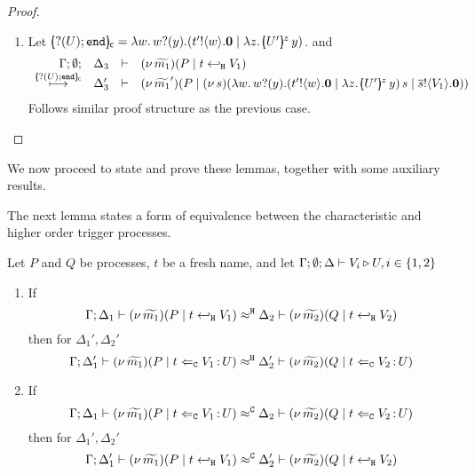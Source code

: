 \begin{proof}
\begin{enumerate}
\begin{enumerate}
						\item	Let $\omapchar{\btinp{U} \tinact} = \abs{w}{ \binp{w}{y} ( \bout{t'}{w} \inact \Par \appl{\abs{z}{\mapchar{U'}{z}}}{y} ) } $.
								and
							\[	
								\mhorel{\Gamma}{\Delta_3}{\newsp{\widetilde{m_1}}{P \Par \htrigger{t}{V_1}  } }
								{\hby{\omapchar{\btinp{U}\tinact}}}
								{\Delta_3'}{}
								{\newsp{\widetilde{m_1}'}{P \Par \newsp{s}{\appl{\abs{w}{ \binp{w}{y} ( \bout{t'}{w} \inact \Par \appl{\abs{z}{\mapchar{U'}{z}}}{y} ) }}{s} \Par \bout{\dual{s}}{V_1} \inact}}}
							\]
							Follows similar proof structure as the previous case.
				\end{enumerate}
	\end{enumerate}
\end{proof}


\noi
We now proceed to state and prove these lemmas, together with some auxiliary results.

The next lemma states a form of equivalence between the characteristic
and higher order trigger processes.

\begin{lemma}
	\label{lem:trigger_equiv}
	Let $P$ and $Q$ be processes, $t$ be a fresh name, and
	let $\Gamma; \emptyset; \Delta \vdash V_i \triangleright U, i \in \{1, 2\}$

	\begin{enumerate}[1)]
		\item	If
				\[
					\Gamma; \Delta_1 \vdash (\nu\, \widetilde{m_1})(P \;|\; t \hookleftarrow_{\mathtt{H}} V_1) \approx^\mathtt{H} \Delta_2 \vdash (\nu\, \widetilde{m_2})(Q \;|\; t \hookleftarrow_{\mathtt{H}} V_2 )
				\]
				then for $\Delta_1', \Delta_2'$
				\[
					\Gamma; \Delta_1' \vdash (\nu\, \widetilde{m_1})(P \;|\; t \Leftarrow_{\mathtt{C}} V_1{\,:\,}U) \approx^\mathtt{H} \Delta_2' \vdash (\nu\, \widetilde{m_2})(Q \;|\; t \Leftarrow_{\mathtt{C}} V_2{\,:\,}U)
				\]

		\item	If
				\[
					\Gamma; \Delta_1 \vdash (\nu\, \widetilde{m_1})(P \;|\; t \Leftarrow_{\mathtt{C}} V_1{\,:\,}U) \approx^\mathtt{C} \Delta_2 \vdash (\nu\, \widetilde{m_2})(Q \;|\; t \Leftarrow_{\mathtt{C}} V_2{\,:\,}U)
				\]
				then for $\Delta_1', \Delta_2'$
				\[
					\Gamma; \Delta_1' \vdash (\nu\, \widetilde{m_1})(P \;|\; t \hookleftarrow_{\mathtt{H}} V_1) \approx^\mathtt{C} \Delta_2' \vdash (\nu\, \widetilde{m_2})(Q \;|\; t \hookleftarrow_{\mathtt{H}} V_2 )
				\]
	\end{enumerate}
\end{lemma}

